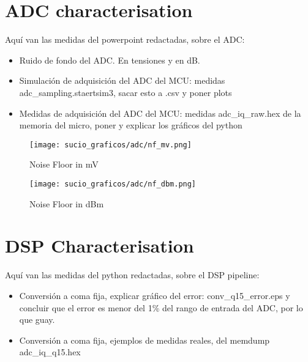 \section{ADC characterisation}
Aquí van las medidas del powerpoint redactadas, sobre el ADC:
\begin{itemize}
	\item Ruido de fondo del ADC. En tensiones y en dB.
	\item Simulación de adquisición del ADC del MCU: medidas adc\_sampling.staertsim3, sacar esto a .csv y poner plots
	\item Medidas de adquisición del ADC del MCU: medidas adc\_iq\_raw.hex de la memoria del micro, poner y explicar los gráficos del python
\end{itemize}
\begin{figure}[ht]
	\centering
	\texttt{[image: sucio\_graficos/adc/nf\_mv.png]}
	\caption{Noise Floor in mV}
	\label{fig:moduloaprox50cmplancha}
\end{figure}
\begin{figure}[ht]
	\centering
	\texttt{[image: sucio\_graficos/adc/nf\_dbm.png]}
	\caption{Noise Floor in dBm}
	\label{fig:moduloaprox50cmplancha}
\end{figure}
\section{DSP Characterisation}
Aquí van las medidas del python redactadas, sobre el DSP pipeline:
\begin{itemize}
	\item Conversión a coma fija, explicar gráfico del error: conv\_q15\_error.eps y concluir que el error es menor del 1\% del rango de entrada del ADC, por lo que guay.
	\item Conversión a coma fija, ejemplos de medidas reales, del memdump adc\_iq\_q15.hex
\end{itemize}
